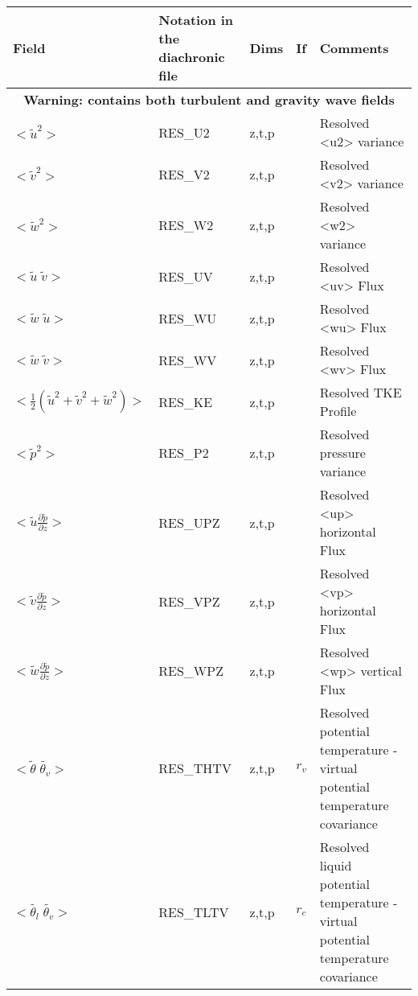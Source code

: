 \begin{longtable}[c]{|p{}|p{}|p{}|p{}|p{}|}
\hline
Field & Notation in the diachronic file & Dims & If  & Comments \\
\hline \hline
\endhead
\multicolumn{5}{|c|}{\textbf{Warning: contains both turbulent and gravity wave fields}} \\
\hline
\endfoot
$<\tilde{u}^2>$                                      & RES\_U2    & z,t,p   &       & Resolved <u2> variance \\\hline
$<\tilde{v}^2>$                                      & RES\_V2    & z,t,p   &       & Resolved <v2> variance \\\hline
$<\tilde{w}^2>$                                      & RES\_W2    & z,t,p   &       & Resolved <w2> variance \\\hline
$<\tilde{u}\;\tilde{v}>$                             & RES\_UV    & z,t,p   &       & Resolved <uv> Flux \\\hline
$<\tilde{w}\;\tilde{u}>$                             & RES\_WU    & z,t,p   &       & Resolved <wu> Flux \\\hline
$<\tilde{w}\;\tilde{v}>$                             & RES\_WV    & z,t,p   &       & Resolved <wv> Flux \\\hline
$<\frac{1}{2}(\tilde{u}^2+\tilde{v}^2+\tilde{w}^2)>$ & RES\_KE    & z,t,p   &       & Resolved TKE Profile\\\hline
$<\tilde{p}^2>$                                      & RES\_P2    & z,t,p   &       & Resolved pressure variance \\\hline
$<\tilde{u}\frac{\partial\tilde{p}}{\partial z}>$    & RES\_UPZ   & z,t,p   &       & Resolved <up> horizontal Flux \\\hline
$<\tilde{v}\frac{\partial\tilde{p}}{\partial z}>$    & RES\_VPZ   & z,t,p   &       & Resolved <vp> horizontal Flux\\\hline
$<\tilde{w}\frac{\partial\tilde{p}}{\partial z}>$    & RES\_WPZ   & z,t,p   &       & Resolved <wp> vertical Flux \\\hline
$<\tilde{\theta}\;\tilde{\theta_v}>$                 & RES\_THTV  & z,t,p   & $r_v$ & Resolved potential temperature - virtual potential temperature covariance \\\hline
$<\tilde{\theta_l}\;\tilde{\theta_v}>$               & RES\_TLTV  & z,t,p   & $r_c$ & Resolved liquid potential temperature - virtual potential temperature covariance \\\hline

\end{longtable}
